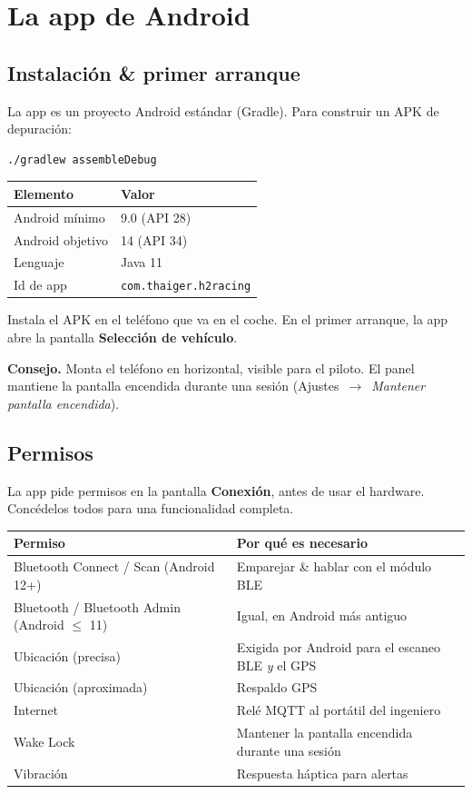 \documentclass[11pt,a4paper,oneside]{report}
\newcommand{\arrow}{\,$\rightarrow$\,}
\newcommand{\code}[1]{\texttt{#1}}
\begin{document}
\section{La app de Android}

\subsection{Instalación \& primer arranque}
La app es un proyecto Android estándar (Gradle). Para construir un APK de
depuración:

\begin{lstlisting}
./gradlew assembleDebug
\end{lstlisting}

\begin{tabularx}{\linewidth}{@{}lL@{}}
\toprule
\textbf{Elemento} & \textbf{Valor}\\
\midrule
Android mínimo & 9.0 (API 28)\\
Android objetivo & 14 (API 34)\\
Lenguaje & Java 11\\
Id de app & \code{com.thaiger.h2racing}\\
\bottomrule
\end{tabularx}

\medskip
Instala el APK en el teléfono que va en el coche. En el primer arranque, la app
abre la pantalla \textbf{Selección de vehículo}.
\begin{tgnote}
\textbf{Consejo.} Monta el teléfono en horizontal, visible para el piloto. El panel
mantiene la pantalla encendida durante una sesión (Ajustes \arrow{} \emph{Mantener
pantalla encendida}).
\end{tgnote}

\subsection{Permisos}
La app pide permisos en la pantalla \textbf{Conexión}, antes de usar el hardware.
Concédelos todos para una funcionalidad completa.

\begin{tabularx}{\linewidth}{@{}lL@{}}
\toprule
\textbf{Permiso} & \textbf{Por qué es necesario}\\
\midrule
Bluetooth Connect / Scan (Android 12+) & Emparejar \& hablar con el módulo BLE\\
Bluetooth / Bluetooth Admin (Android $\le$ 11) & Igual, en Android más antiguo\\
Ubicación (precisa) & Exigida por Android para el escaneo BLE \emph{y} el GPS\\
Ubicación (aproximada) & Respaldo GPS\\
Internet & Relé MQTT al portátil del ingeniero\\
Wake Lock & Mantener la pantalla encendida durante una sesión\\
Vibración & Respuesta háptica para alertas\\
\bottomrule
\end{tabularx}
\end{document}
